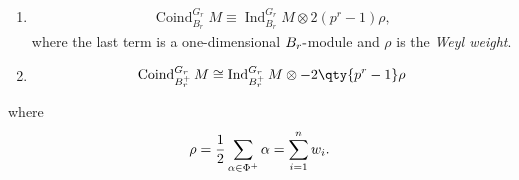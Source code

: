 \begin{proposition}[?]

\hfill

\begin{enumerate}
\def\labelenumi{\arabic{enumi}.}
\item

  \begin{align*}\operatorname{Coind}_{B_r}^{G_r} M \equiv \operatorname{Ind}_{B_r}^{G_r} M\otimes 2(p^r - 1)\rho,\end{align*}
  where the last term is a one-dimensional \(B_r{\hbox{-}}\)module and
  \(\rho\) is the \emph{Weyl weight}.
\item

  \begin{align*}\operatorname{Coind}_{B_r^+}^{G_r} M \cong \operatorname{Ind}_{B_r^+}^{G_r} M \otimes-2\qty{p^r-1}\rho\end{align*}
\end{enumerate}

where
\begin{align*}  
\rho = {1\over 2}\sum_{\alpha\in\Phi^+} \alpha = \sum_{i=1}^n w_i
.\end{align*}

\end{proposition}

